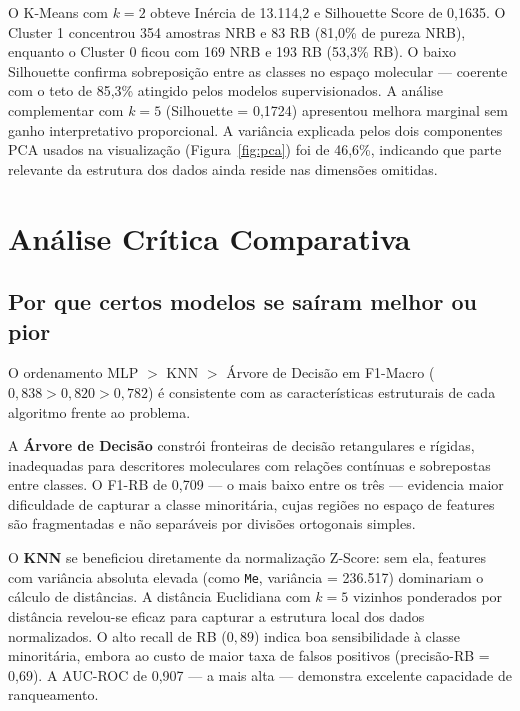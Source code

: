 \documentclass[12pt, a4paper]{article}
\begin{document}
O K-Means com $k=2$ obteve Inércia de 13.114,2 e Silhouette Score de
0,1635. O Cluster 1 concentrou 354 amostras NRB e 83 RB (81,0\% de
pureza NRB), enquanto o Cluster 0 ficou com 169 NRB e 193 RB (53,3\% RB).
O baixo Silhouette confirma sobreposição entre as classes no espaço
molecular --- coerente com o teto de 85,3\% atingido pelos modelos
supervisionados. A análise complementar com $k=5$ (Silhouette = 0,1724)
apresentou melhora marginal sem ganho interpretativo proporcional.
A variância explicada pelos dois componentes PCA usados na visualização
(Figura~\ref{fig:pca}) foi de 46,6\%, indicando que parte relevante
da estrutura dos dados ainda reside nas dimensões omitidas.

\section{Análise Crítica Comparativa}

\subsection{Por que certos modelos se saíram melhor ou pior}

O ordenamento MLP $>$ KNN $>$ Árvore de Decisão em F1-Macro
($0{,}838 > 0{,}820 > 0{,}782$) é consistente com as características
estruturais de cada algoritmo frente ao problema.

A \textbf{Árvore de Decisão} constrói fronteiras de decisão retangulares e
rígidas, inadequadas para descritores moleculares com relações contínuas e
sobrepostas entre classes. O F1-RB de 0,709 --- o mais baixo entre os três ---
evidencia maior dificuldade de capturar a classe minoritária, cujas regiões
no espaço de features são fragmentadas e não separáveis por divisões
ortogonais simples.

O \textbf{KNN} se beneficiou diretamente da normalização Z-Score: sem ela,
features com variância absoluta elevada (como \texttt{Me}, variância = 236.517)
dominariam o cálculo de distâncias. A distância Euclidiana com $k=5$ vizinhos
ponderados por distância revelou-se eficaz para capturar a estrutura local dos
dados normalizados. O alto recall de RB ($0{,}89$) indica boa sensibilidade à
classe minoritária, embora ao custo de maior taxa de falsos positivos (precisão-RB
= 0,69). A AUC-ROC de 0,907 --- a mais alta --- demonstra excelente capacidade de
ranqueamento.
\end{document}

